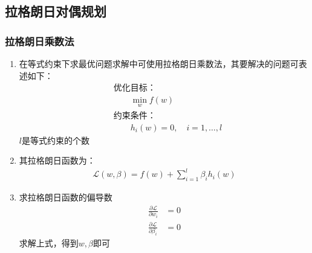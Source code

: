 \subsection{拉格朗日对偶规划}
\subsubsection{拉格朗日乘数法}
\begin{enumerate}
	\item 在等式约束下求最优问题求解中可使用拉格朗日乘数法，其要解决的问题可表述如下：
	\begin{align}
		&\text{优化目标：} \\
		& \qquad \min_{w} f(w) \\
		&\text{约束条件：} \\
		& \qquad h_i(w) = 0, \quad i=1,\dots,l
	\end{align}
	$l$是等式约束的个数
	\item 其拉格朗日函数为：
	\begin{align}
		\mathcal{L}(w,\beta) = f(w) + \sum_{i=1}^{l}\beta_ih_i(w)
	\end{align}
	\item 求拉格朗日函数的偏导数
	\begin{align}
		\frac{\partial \mathcal{L}}{\partial w_i} &= 0\\
		\frac{\partial \mathcal{L}}{\partial \beta_i} &= 0
	\end{align}
	求解上式，得到$w, \beta$即可
\end{enumerate}

